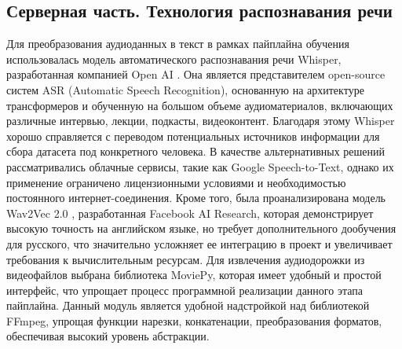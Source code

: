 \begin{table}[h!]
\centering
{}
\caption{Сравнение моделей по бенчмарку PingPong}
\label{tab:pingpong}
\end{table}

\subsection{Серверная часть. Технология распознавания речи}
Для преобразования аудиоданных в текст в рамках пайплайна обучения использовалась модель автоматического распознавания речи Whisper, разработанная компанией Open AI \cite{Zhao2024WhisperPMFA}. Она является представителем open-source систем ASR (Automatic Speech Recognition), основанную на архитектуре трансформеров и обученную на большом объеме аудиоматериалов, включающих различные интервью, лекции, подкасты, видеоконтент. Благодаря этому Whisper хорошо справляется с переводом потенциальных источников информации для сбора датасета под конкретного человека.
В качестве альтернативных решений рассматривались облачные сервисы, такие как Google Speech-to-Text, однако их применение ограничено лицензионными условиями и необходимостью постоянного интернет-соединения. Кроме того, была проанализирована модель Wav2Vec 2.0 \cite{Baevski2020Wav2Vec2}, разработанная Facebook AI Research, которая демонстрирует высокую точность на английском языке, но требует дополнительного дообучения для русского, что значительно усложняет ее интеграцию в проект и увеличивает требования к вычислительным ресурсам.
Для извлечения аудиодорожки из видеофайлов выбрана библиотека MoviePy, которая имеет удобный и простой интерфейс, что упрощает процесс программной реализации данного этапа пайплайна. Данный модуль является удобной надстройкой над библиотекой FFmpeg, упрощая функции нарезки, конкатенации, преобразования форматов, обеспечивая высокий уровень абстракции. 



